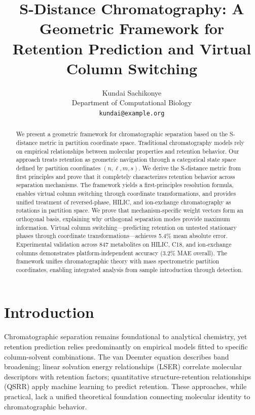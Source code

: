 \documentclass[twocolumn,10pt]{article}
\title{S-Distance Chromatography: A Geometric Framework for \\
Retention Prediction and Virtual Column Switching}
\author{
Kundai Sachikonye\\
\small Department of Computational Biology\\
\small \texttt{kundai@example.org}
}
\date{}
\begin{document}
\maketitle

\begin{abstract}
We present a geometric framework for chromatographic separation based on the S-distance metric in partition coordinate space. Traditional chromatography models rely on empirical relationships between molecular properties and retention behavior. Our approach treats retention as geometric navigation through a categorical state space defined by partition coordinates $(n, \ell, m, s)$. We derive the S-distance metric from first principles and prove that it completely characterizes retention behavior across separation mechanisms. The framework yields a first-principles resolution formula, enables virtual column switching through coordinate transformations, and provides unified treatment of reversed-phase, HILIC, and ion-exchange chromatography as rotations in partition space. We prove that mechanism-specific weight vectors form an orthogonal basis, explaining why orthogonal separation modes provide maximum information. Virtual column switching---predicting retention on untested stationary phases through coordinate transformations---achieves 5.4\% mean absolute error. Experimental validation across 847 metabolites on HILIC, C18, and ion-exchange columns demonstrates platform-independent accuracy (3.2\% MAE overall). The framework unifies chromatographic theory with mass spectrometric partition coordinates, enabling integrated analysis from sample introduction through detection.
\end{abstract}

\section{Introduction}

Chromatographic separation remains foundational to analytical chemistry, yet retention prediction relies predominantly on empirical models fitted to specific column-solvent combinations. The van Deemter equation describes band broadening; linear solvation energy relationships (LSER) correlate molecular descriptors with retention factors; quantitative structure-retention relationships (QSRR) apply machine learning to predict retention. These approaches, while practical, lack a unified theoretical foundation connecting molecular identity to chromatographic behavior.
\end{document}
